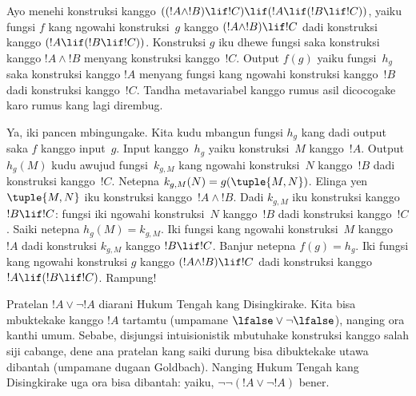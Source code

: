 \documentclass[../../../include/open-logic-section]{subfiles}
\begin{document}
\begin{ex}
Ayo menehi konstruksi kanggo $((!A \land !B) \lif !C) \lif (!A \lif
(!B \lif !C))$, yaiku fungsi $f$ kang ngowahi konstruksi~$g$ kanggo
$(!A \land !B) \lif !C$ dadi konstruksi kanggo $(!A \lif (!B \lif
!C))$. Konstruksi $g$ iku dhewe fungsi saka konstruksi kanggo
$!A \land !B$ menyang konstruksi kanggo~$!C$. Output $f(g)$ yaiku
fungsi~$h_g$ saka konstruksi kanggo $!A$ menyang fungsi kang ngowahi
konstruksi kanggo~$!B$ dadi konstruksi kanggo~$!C$.
Tandha metavariabel kanggo rumus asil dicocogake karo rumus kang lagi dirembug.

Ya, iki pancen mbingungake. Kita kudu mbangun fungsi $h_g$ kang dadi
output saka $f$ kanggo input~$g$. Input kanggo~$h_g$ yaiku
konstruksi~$M$ kanggo~$!A$. Output $h_g(M)$ kudu awujud fungsi~$k_{g,M}$
kang ngowahi konstruksi~$N$ kanggo~$!B$ dadi konstruksi kanggo~$!C$.
Netepna $k_{g,M}(N) = g(\tuple{M, N})$. Elinga yen $\tuple{M,
  N}$ iku konstruksi kanggo~$!A \land !B$. Dadi $k_{g,M}$ iku
konstruksi kanggo $!B \lif !C$: fungsi iki ngowahi konstruksi~$N$
kanggo~$!B$ dadi konstruksi kanggo~$!C$. Saiki netepna
$h_g(M) = k_{g,M}$. Iki fungsi kang ngowahi konstruksi~$M$ kanggo~$!A$
dadi konstruksi $k_{g,M}$ kanggo $!B
\lif !C$. Banjur netepna $f(g) = h_g$. Iki fungsi kang ngowahi
konstruksi $g$ kanggo $(!A \land !B) \lif !C$ dadi konstruksi kanggo
$!A
\lif (!B \lif !C)$. Rampung!{}
\end{ex}

Pratelan $!A \lor \lnot !A$ diarani Hukum Tengah kang Disingkirake.
Kita bisa mbuktekake kanggo $!A$ tartamtu (umpamane $\lfalse \lor
\lnot \lfalse$), nanging ora kanthi umum. Sebabe, disjungsi
intuisionistik mbutuhake konstruksi kanggo salah siji cabange, dene
ana pratelan kang saiki durung bisa dibuktekake utawa dibantah
(umpamane dugaan Goldbach). Nanging Hukum Tengah kang Disingkirake uga
ora bisa dibantah: yaiku, $\lnot \lnot (!A
\lor \lnot !A)$ bener.
\end{document}
